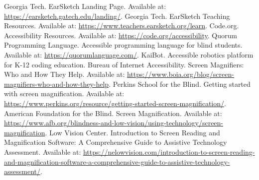 \begin{thebibliography}{99}
 Georgia Tech. EarSketch Landing Page. Available at: \url{https://earsketch.gatech.edu/landing/}.
 Georgia Tech. EarSketch Teaching Resources. Available at: \url{https://www.teachers.earsketch.org/learn}.
 Code.org. Accessibility Resources. Available at: \url{https://code.org/accessibility}.
 Quorum Programming Language. Accessible programming language for blind students. Available at: \url{https://quorumlanguage.com/}.
 KaiBot. Accessible robotics platform for K-12 coding education.
 Bureau of Internet Accessibility. Screen Magnifiers: Who and How They Help. Available at: \url{https://www.boia.org/blog/screen-magnifiers-who-and-how-they-help}.
 Perkins School for the Blind. Getting started with screen magnification. Available at: \url{https://www.perkins.org/resource/getting-started-screen-magnification/}.
 American Foundation for the Blind. Screen Magnification. Available at: \url{https://www.afb.org/blindness-and-low-vision/using-technology/screen-magnification}.
 Low Vision Center. Introduction to Screen Reading and Magnification Software: A Comprehensive Guide to Assistive Technology Assessment. Available at: \url{https://nelowvision.com/introduction-to-screen-reading-and-magnification-software-a-comprehensive-guide-to-assistive-technology-assessment/}.
\end{thebibliography}
